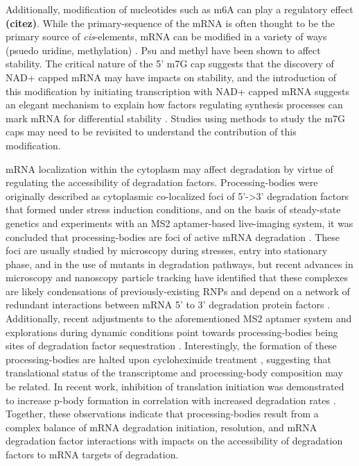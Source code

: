 {Additionally, modification of
nucleotides such as m6A can play a regulatory effect \textbf{(citez)}.
While the primary-sequence of the mRNA is often thought to be the
primary source of \textit{cis}-elements,
mRNA can be modified in a variety of ways
(psuedo uridine, methylation)
\parencite{walters2017identification}.
Psu and methyl have been shown to affect stability.
The critical nature of the 5' m7G cap suggests that the
discovery of NAD+ capped mRNA may have impacts on
stability, and the introduction of this modification by
initiating transcription with NAD+ capped mRNA suggests an
elegant mechanism to explain how factors regulating synthesis 
processes can mark mRNA for differential 
stability \parencite{walters2017identification}.
Studies using methods to study the m7G caps may need to be revisited
to understand the contribution of this modification.

mRNA
localization within the cytoplasm may affect degradation by virtue of
regulating the accessibility of degradation factors. Processing-bodies
were originally described as cytoplasmic co-localized foci of 5’->3’
degradation factors that formed under stress induction conditions, and
on the basis of steady-state genetics and experiments with an MS2
aptamer-based live-imaging system, it was concluded that
processing-bodies are foci of active mRNA degradation 
\parencite{sheth2003decapping}.
These foci are usually studied by microscopy during
stresses, entry into stationary phase, and in the use of mutants in
degradation pathways, but recent advances in microscopy and nanoscopy
particle tracking have identified that these complexes are likely
condensations of previously-existing RNPs and depend on a network of
redundant interactions between mRNA 5’ to 3’ degradation protein
factors 
\parencite{lui2014granules,rao2017numerous}.
Additionally, recent
adjustments to the aforementioned MS2 aptamer system and explorations
during dynamic conditions point towards processing-bodies being sites
of degradation factor sequestration 
\parencite{huch2017mrna,tutucci2017improved}.
Interestingly, the formation of these processing-bodies are
halted upon cycloheximide treatment 
\parencite{sheth2003decapping},
suggesting that translational status of the transcriptome and
processing-body composition may be related. In recent work, inhibition
of translation initiation was demonstrated to increase p-body
formation in correlation with increased degradation rates 
\parencite{chan2017non}. 
Together, these observations indicate that processing-bodies
result from a complex balance of mRNA degradation initiation,
resolution, and mRNA degradation factor interactions with impacts on
the accessibility of degradation factors to mRNA targets of
degradation.  

}
